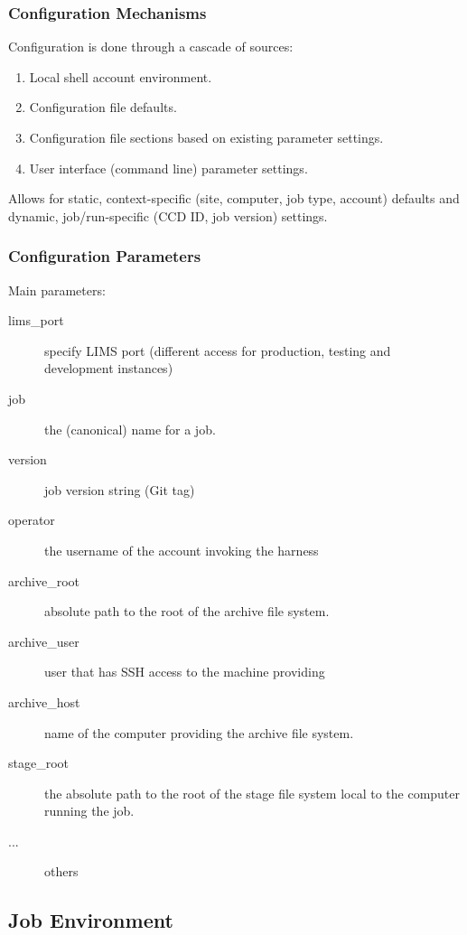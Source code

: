 \documentclass[xcolor=dvipsnames]{beamer}
\begin{document}
\begin{frame}
  \frametitle{Configuration Mechanisms}
  Configuration is done through a cascade of sources:

  \begin{enumerate}
  \item Local shell account environment.
  \item Configuration file defaults.
  \item Configuration file sections based on existing parameter
    settings.
  \item User interface (command line) parameter settings.
  \end{enumerate}

  Allows for static, context-specific (site, computer, job type,
  account) defaults and dynamic, job/run-specific (CCD ID, job
  version) settings.
  
\end{frame}
\begin{frame}
  \frametitle{Configuration Parameters}
  Main parameters:
  \begin{description}
  \item[lims\_port] specify LIMS port (different access for
    production, testing and development instances)
  \item[job] the (canonical) name for a job.
  \item[version] job version string (Git tag)
  \item[operator] the username of the account invoking the harness
  \item[archive\_root] absolute path to the root of the archive file system.
  \item[archive\_user] user that has SSH access to the machine providing
  \item[archive\_host] name of the computer providing the
    archive file system.
  \item[stage\_root] the absolute path to the root of the stage file
    system local to the computer running the job.
  \item[...] others

  \end{description}

\end{frame}


\subsection{Job Environment}
\end{document}
